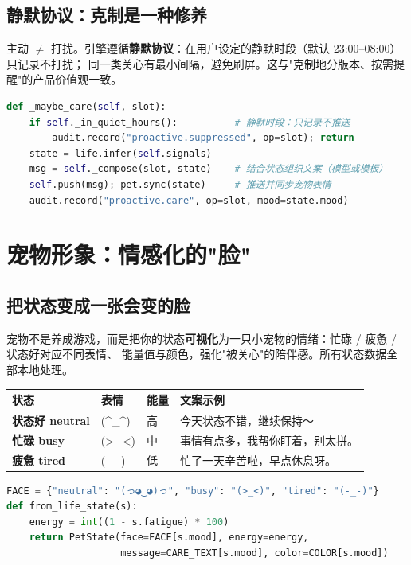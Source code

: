 \section{静默协议：克制是一种修养}
主动 $\ne$ 打扰。引擎遵循\textbf{静默协议}：在用户设定的静默时段（默认 23:00--08:00）只记录不打扰；
同一类关心有最小间隔，避免刷屏。这与"克制地分版本、按需提醒"的产品价值观一致。

\begin{lstlisting}[language=Python,caption={定时与静默（proactive/engine.py 摘选）}]
def _maybe_care(self, slot):
    if self._in_quiet_hours():          # 静默时段：只记录不推送
        audit.record("proactive.suppressed", op=slot); return
    state = life.infer(self.signals)
    msg = self._compose(slot, state)    # 结合状态组织文案（模型或模板）
    self.push(msg); pet.sync(state)     # 推送并同步宠物表情
    audit.record("proactive.care", op=slot, mood=state.mood)
\end{lstlisting}


\chapter{宠物形象：情感化的"脸"}

\section{把状态变成一张会变的脸}
宠物不是养成游戏，而是把你的状态\textbf{可视化}为一只小宠物的情绪：忙碌 / 疲惫 / 状态好对应不同表情、
能量值与颜色，强化"被关心"的陪伴感。所有状态数据全部本地处理。

\begin{center}
\small
\begin{tabularx}{\linewidth}{>{\bfseries}p{2.6cm} p{2.6cm} p{2.4cm} X}
\toprule
状态 & 表情 & 能量 & 文案示例 \\
\midrule
状态好 neutral & (\textasciicircum{}\_\textasciicircum) & 高 & 今天状态不错，继续保持～ \\
忙碌 busy & (\textgreater\_\textless) & 中 & 事情有点多，我帮你盯着，别太拼。 \\
疲惫 tired & (-\_-) & 低 & 忙了一天辛苦啦，早点休息呀。 \\
\bottomrule
\end{tabularx}
\end{center}

\begin{lstlisting}[language=Python,caption={状态到情绪的映射（capabilities/pet/state.py 摘选）}]
FACE = {"neutral": "(っ◕‿◕)っ", "busy": "(>_<)", "tired": "(-_-)"}
def from_life_state(s):
    energy = int((1 - s.fatigue) * 100)
    return PetState(face=FACE[s.mood], energy=energy,
                    message=CARE_TEXT[s.mood], color=COLOR[s.mood])
\end{lstlisting}


